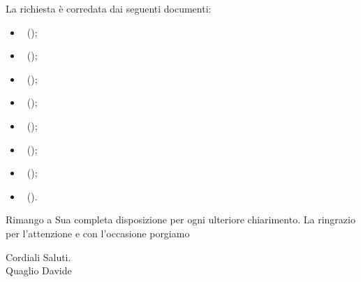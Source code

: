 \documentclass[11pt,a4paper]{article}
\begin{document}
La richiesta è corredata dai seguenti documenti:
\begin{itemize}
\item \infoPDP ~(\PianoDiProgetto);
\item \infoPDQ ~(\PianoDiQualifica);
\item \infoNDP ~(\NormeDiProgetto);
\item \infoDP ~(\DefinizioneDiProdotto);
\item \infoMPO ~(\ManualePO);
\item \infoMU ~(\ManualeUtente);
\item \infoG ~(\Glossario);
\item \infoST ~(\SpecificaTecnica). 
\end{itemize}

Rimango a Sua completa disposizione per ogni ulteriore chiarimento.
La ringrazio per l'attenzione e con l'occasione porgiamo\\
\begin{flushright}
Cordiali Saluti.\\
Quaglio Davide
\end{flushright}
\end{document}
